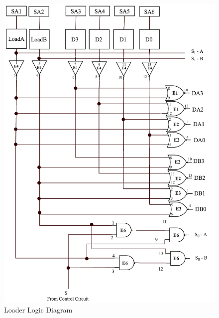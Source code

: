 \documentclass[journal, twocolumn, final,11pt,letterpaper]{IEEEtran}
\begin{document}
\begin{figure} [htbp]
	\centering
	\includegraphics[scale=0.60]{Loader_Logic.png}
	\caption{Loader Logic Diagram\label{fig:loader-logic-diagram}}
\end{figure}
\end{document}
